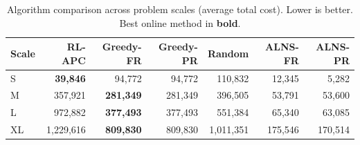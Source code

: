 \begin{table}[htbp]
\centering
\caption{Algorithm comparison across problem scales (average total cost). Lower is better. Best online method in \textbf{bold}.}
\label{tab:comparison}
\small
\begin{tabular}{lrrrrrr}
\toprule
Scale & RL-APC & Greedy-FR & Greedy-PR & Random & ALNS-FR & ALNS-PR \\
\midrule
S & \textbf{39,846} & 94,772 & 94,772 & 110,832 & 12,345 & 5,282 \\
M & 357,921 & \textbf{281,349} & 281,349 & 396,505 & 53,791 & 53,600 \\
L & 972,882 & \textbf{377,493} & 377,493 & 551,384 & 65,340 & 63,085 \\
XL & 1,229,616 & \textbf{809,830} & 809,830 & 1,011,351 & 175,546 & 170,514 \\
\bottomrule
\end{tabular}
\end{table}